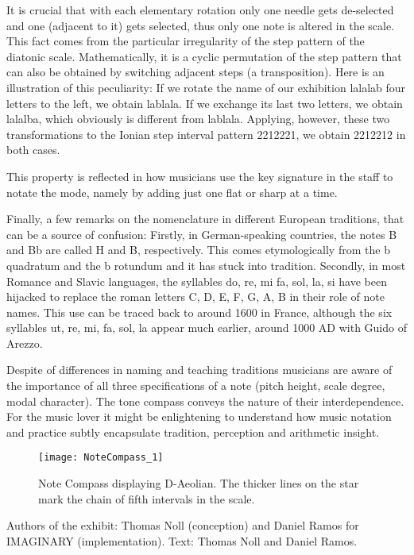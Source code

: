 It is crucial that with each elementary rotation only one needle gets de-selected and one (adjacent to it) gets selected, thus only one note is altered in the scale. This fact comes from the particular irregularity of the step pattern of the diatonic scale. Mathematically, it is a cyclic permutation of the step pattern that can also be obtained by switching adjacent steps (a transposition). Here is an illustration of this peculiarity: If we rotate the name of our exhibition lalalab four letters to the left, we obtain lablala. If we exchange its last two letters, we obtain lalalba, which obviously is different from lablala. Applying, however, these two transformations to the Ionian step interval pattern 2212221, we obtain 2212212 in both cases.

This property is reflected in how musicians use the key signature in the staff to notate the mode, namely by adding just one flat or sharp at a time.

Finally, a few remarks on the nomenclature in different European traditions, that can be a source of confusion: Firstly, in German-speaking countries, the notes B and Bb are called H and B, respectively. This comes etymologically from the b quadratum and the b rotundum and it has stuck into tradition. Secondly, in most Romance and Slavic languages, the syllables do, re, mi fa, sol, la, si have been hijacked to replace the roman letters C, D, E, F, G, A, B in their role of note names. This use can be traced back to around 1600 in France, although the six syllables ut, re, mi, fa, sol, la appear much earlier, around 1000 AD with Guido of Arezzo. 

Despite of differences in naming and teaching traditions musicians are aware of the importance of all three specifications of a note (pitch height, scale degree, modal character). The tone compass conveys the nature of their interdependence. For the music lover it might be enlightening to understand how music notation and practice subtly encapsulate tradition, perception and arithmetic insight.

\begin{figure}[hp]
\centering
\texttt{[image: NoteCompass\_1]}
\caption*{Note Compass displaying D-Aeolian. The thicker lines on the star mark the chain of fifth intervals in the scale.}
\end{figure}


\vfill

Authors of the exhibit: Thomas Noll (conception) and Daniel Ramos for IMAGINARY (implementation). Text: Thomas Noll and Daniel Ramos.



